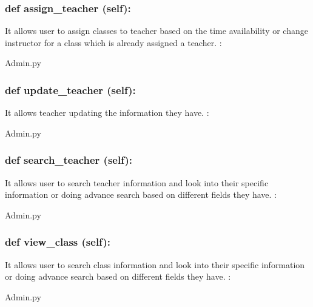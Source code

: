 \hypertarget{class_poly_a14a7ad77ce612b0c54f531d307ee4b39}{
\subsubsection[{def assign_teacher(self):}]{\setlength{\rightskip}{0pt plus 5cm}def {assign\_teacher} (self):}}\label{class_poly_a14a7ad77ce612b0c54f531d307ee4b39}
It allows user to assign classes to teacher based on the time availability or change instructor for a class which is already assigned a teacher.
:\begin{DoxyCompactItemize}
\item 
Admin.\-py\end{DoxyCompactItemize}

\hypertarget{class_poly_a14a7ad77ce612b0c54f531d307ee4b39}{
\subsubsection[{def update_teacher(self):}]{\setlength{\rightskip}{0pt plus 5cm}def {update\_teacher} (self):}}\label{class_poly_a14a7ad77ce612b0c54f531d307ee4b39}
It allows teacher updating the information they have.
:\begin{DoxyCompactItemize}
\item 
Admin.\-py\end{DoxyCompactItemize}

\hypertarget{class_poly_a14a7ad77ce612b0c54f531d307ee4b39}{
\subsubsection[{def search_teacher(self):}]{\setlength{\rightskip}{0pt plus 5cm}def {search\_teacher} (self):}}\label{class_poly_a14a7ad77ce612b0c54f531d307ee4b39}
It allows user to search teacher information and look into their specific information or doing advance search based on different fields they have.
:\begin{DoxyCompactItemize}
\item 
Admin.\-py\end{DoxyCompactItemize}

\hypertarget{class_poly_a14a7ad77ce612b0c54f531d307ee4b39}{
\subsubsection[{def view_class(self):}]{\setlength{\rightskip}{0pt plus 5cm}def {view\_class} (self):}}\label{class_poly_a14a7ad77ce612b0c54f531d307ee4b39}
It allows user to search class information and look into their specific information or doing advance search based on different fields they have.
:\begin{DoxyCompactItemize}
\item 
Admin.\-py\end{DoxyCompactItemize}

